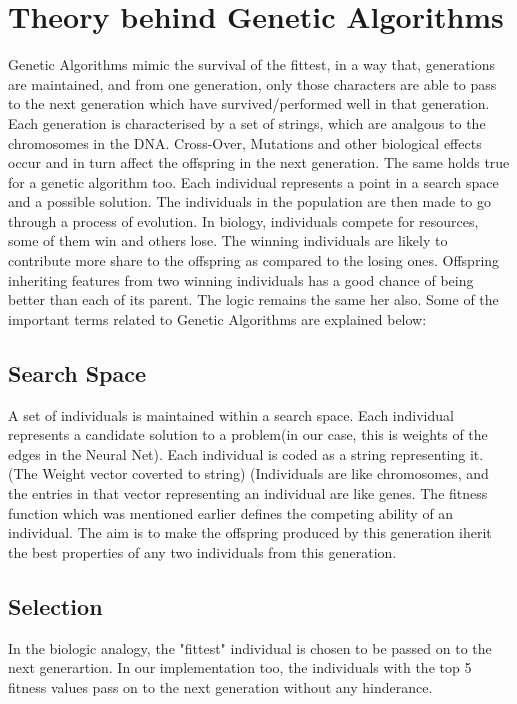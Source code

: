\documentclass{article}
\begin{document}
\section{Theory behind Genetic Algorithms}

Genetic Algorithms mimic the survival of the fittest, in a way that, generations are maintained, and from one generation, only those characters are able to pass to the next generation which have survived/performed well in that generation. Each generation is characterised by a set of strings, which are analgous to the chromosomes in the DNA. Cross-Over, Mutations and other biological effects occur and in turn affect the offspring in the next generation. The same holds true for a genetic algorithm too. Each individual represents a point in a search space and a possible solution. The individuals in the population are then made to go through a process of evolution.
\hfill \break
\hfill \break
In biology, individuals compete for resources, some of them win and others lose. The winning individuals are likely to contribute more share to the offspring as compared to the losing ones. Offspring inheriting features from two winning individuals has a good chance of being better than each of its parent. The logic remains the same her also. Some of the important terms related to Genetic Algorithms are explained below:  

\subsection{Search Space}

A set of individuals is maintained within a search space. Each individual represents a candidate solution to a problem(in our case, this is weights of the edges in the Neural Net). Each individual is coded as a string representing it. (The Weight vector coverted to string) (Individuals are like chromosomes, and the entries in that vector representing an individual are like genes. The fitness function which was mentioned earlier defines the competing ability of an individual. The aim is to make the offspring produced by this generation iherit the best properties of any two individuals from this generation.

\subsection{Selection}

In the biologic analogy, the "fittest" individual is chosen to be passed on to the next generartion. In our implementation too, the individuals with the top 5 fitness values pass on to the next generation without any hinderance. 
\end{document}
